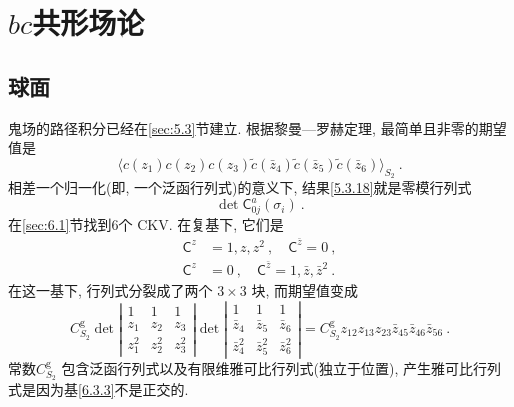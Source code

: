 \newpage

\section{\texorpdfstring{$bc$共形场论}{bc共形场论}} \label{sec:6.3}

\subsection*{球面}

鬼场的路径积分已经在\ref{sec:5.3}节建立. 根据黎曼—罗赫定理, 最简单且非零的期望值是
\begin{equation}
	\langle c(z_{1}) c(z_{2}) c(z_{3}) \tilde{c}(\bar{z}_{4}) \tilde{c}(\bar{z}_{5}) \tilde{c}(\bar{z}_{6})\rangle_{S_{2}} \:. \label{6.3.1}
\end{equation}
相差一个归一化(即, 一个泛函行列式)的意义下, 结果\eqref{5.3.18}就是零模行列式
\begin{equation}
	\operatorname{det} \mathsf{C}_{0 j}^{a}(\sigma_{i}) \:. \label{6.3.2}
\end{equation}
在\ref{sec:6.1}节找到6个 CKV. 在复基下, 它们是
\begin{subequations} \label{6.3.3}
\begin{align}
\mathsf{C}^{z} &= 1, z, z^{2}\:, \quad \mathsf{C}^{\bar{z}}=0  \:, \label{6.3.3a} \\
\mathsf{C}^{z} &= 0\:, \quad \mathsf{C}^{\bar{z}}=1, \bar{z}, \bar{z}^{2} \:. \label{6.3.3b}
\end{align}
\end{subequations}
在这一基下, 行列式分裂成了两个 $3 \times 3$ 块, 而期望值变成
\begin{equation}
	C_{S_{2}}^{\mathrm{g}} \operatorname{det}\left|\begin{array}{ccc}
		1 & 1 & 1 \\
		z_{1} & z_{2} & z_{3} \\
		z_{1}^{2} & z_{2}^{2} & z_{3}^{2}
	\end{array}\right| \operatorname{det}\left|\begin{array}{ccc}
		1 & 1 & 1 \\
		\bar{z}_{4} & \bar{z}_{5} & \bar{z}_{6} \\
		\bar{z}_{4}^{2} & \bar{z}_{5}^{2} & \bar{z}_{6}^{2}
	\end{array}\right|=C_{S_{2}}^{\mathrm{g}} z_{12} z_{13} z_{23} \bar{z}_{45} \bar{z}_{46} \bar{z}_{56} \:. \label{6.3.4}
\end{equation}
常数$C_{S_{2}}^{\mathrm{g}}$ 包含泛函行列式以及有限维雅可比行列式(独立于位置), 产生雅可比行列式是因为基\eqref{6.3.3}不是正交的. 

